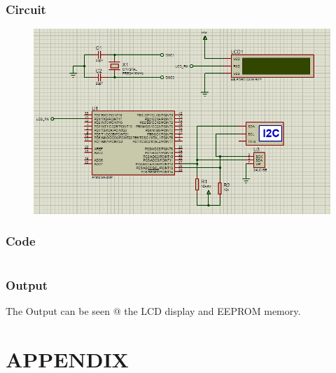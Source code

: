 \documentclass[oneside]{book}
\begin{document}
\subsection{Circuit}
\begin{figure}[H]
    \centering
    \includegraphics[height=0.2\textheight]{I2CEEPROM.png}
\end{figure}
\subsection{Code}
\inputminted[bgcolor=black]{c}{./programFiles/I2CEEPROM.c}

\subsection{Output}
\quad The Output can be seen @ the LCD display and EEPROM memory.







\chapter{APPENDIX}
\end{document}
